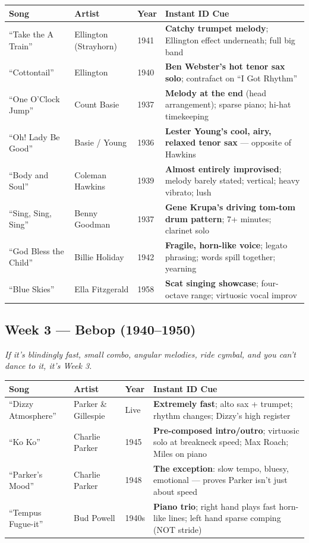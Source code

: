 \documentclass[11pt,letterpaper]{article}
\begin{document}
\begin{small}
\begin{tabularx}{\textwidth}{p{3.3cm} p{2.8cm} p{0.7cm} X}
\toprule
\textbf{Song} & \textbf{Artist} & \textbf{Year} & \textbf{Instant ID Cue} \\
\midrule
``Take the A Train'' & Ellington (Strayhorn) & 1941 & \textbf{Catchy trumpet melody}; Ellington effect underneath; full big band \\
``Cottontail'' & Ellington & 1940 & \textbf{Ben Webster's hot tenor sax solo}; contrafact on ``I Got Rhythm'' \\
``One O'Clock Jump'' & Count Basie & 1937 & \textbf{Melody at the end} (head arrangement); sparse piano; hi-hat timekeeping \\
``Oh! Lady Be Good'' & Basie / Young & 1936 & \textbf{Lester Young's cool, airy, relaxed tenor sax} --- opposite of Hawkins \\
``Body and Soul'' & Coleman Hawkins & 1939 & \textbf{Almost entirely improvised}; melody barely stated; vertical; heavy vibrato; lush \\
``Sing, Sing, Sing'' & Benny Goodman & 1937 & \textbf{Gene Krupa's driving tom-tom drum pattern}; 7+ minutes; clarinet solo \\
``God Bless the Child'' & Billie Holiday & 1942 & \textbf{Fragile, horn-like voice}; legato phrasing; words spill together; yearning \\
``Blue Skies'' & Ella Fitzgerald & 1958 & \textbf{Scat singing showcase}; four-octave range; virtuosic vocal improv \\
\bottomrule
\end{tabularx}
\end{small}

\subsection{\textcolor{week3color}{Week 3 --- Bebop (1940--1950)}}
\emph{If it's blindingly fast, small combo, angular melodies, ride cymbal, and you can't dance to it, it's Week 3.}

\begin{small}
\begin{tabularx}{\textwidth}{p{3.3cm} p{2.8cm} p{0.7cm} X}
\toprule
\textbf{Song} & \textbf{Artist} & \textbf{Year} & \textbf{Instant ID Cue} \\
\midrule
``Dizzy Atmosphere'' & Parker \& Gillespie & Live & \textbf{Extremely fast}; alto sax + trumpet; rhythm changes; Dizzy's high register \\
``Ko Ko'' & Charlie Parker & 1945 & \textbf{Pre-composed intro/outro}; virtuosic solo at breakneck speed; Max Roach; Miles on piano \\
``Parker's Mood'' & Charlie Parker & 1948 & \textbf{The exception}: slow tempo, bluesy, emotional --- proves Parker isn't just about speed \\
``Tempus Fugue-it'' & Bud Powell & 1940s & \textbf{Piano trio}; right hand plays fast horn-like lines; left hand sparse comping (NOT stride) \\
\bottomrule
\end{tabularx}
\end{small}
\end{document}
